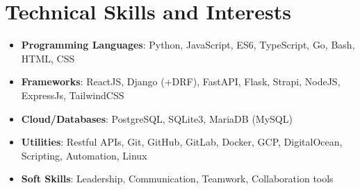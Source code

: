 \section{\textbf{Technical Skills and Interests}}
\begin{itemize}[leftmargin=0.1in]
    \setlength\itemsep{0.05in}
    \item \textbf{Programming Languages}{: Python, JavaScript, ES6, TypeScript, Go, Bash, HTML, CSS} \\
    \item \textbf{Frameworks}{: ReactJS, Django (+DRF), FastAPI, Flask, Strapi, NodeJS, ExpressJs, TailwindCSS} \\
    \item \textbf{Cloud/Databases}{: PostgreSQL, SQLite3, MariaDB (MySQL)} \\
    \item \textbf{Utilities}{: Restful APIs, Git, GitHub, GitLab, Docker, GCP, DigitalOcean, Scripting, Automation, Linux} \\
    \item \textbf{Soft Skills}{: Leadership, Communication, Teamwork, Collaboration tools} \\

\end{itemize}
